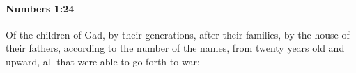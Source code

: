 
		\paragraph{Numbers 1:24} %
			\label{NUMBERS-1-24}

			Of the children of Gad, by their generations, after their families, by the house of their fathers, according to the number of the names, from twenty years old and upward, all that were able to go forth to war;


